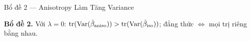 \documentclass[aspectratio=169,9pt]{beamer}
\begin{document}
\begin{frame}{Bổ đề 2 — Anisotropy Làm Tăng Variance}
\vspace{0.6em}
\begin{center}
\begin{minipage}{0.84\textwidth}
\begin{primarybox}
\footnotesize\textbf{Bổ đề 2.} Với $\lambda=0$:\;
$\mathrm{tr}(\mathrm{Var}(\hat\beta_{\rm aniso})) > \mathrm{tr}(\mathrm{Var}(\hat\beta_{\rm iso}))$;
đẳng thức $\Leftrightarrow$ mọi trị riêng bằng nhau.
\end{primarybox}
\end{minipage}
\end{center}

\end{frame}


\end{document}
